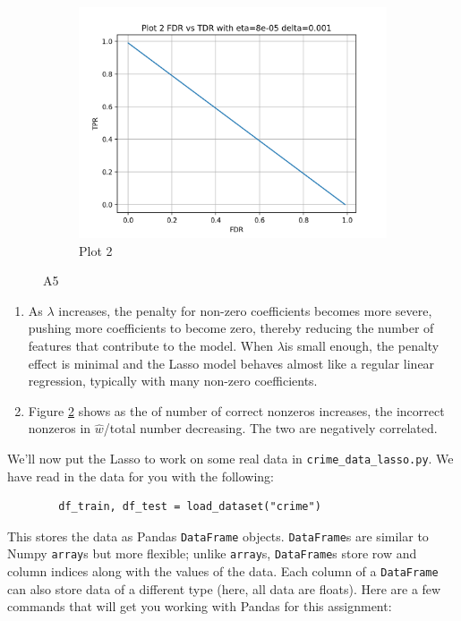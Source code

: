 \documentclass{article}
\begin{document}
\begin{sloppypar}
\begin{aprob}
\begin{figure}[!h]
\begin{subfigure}{.45\textwidth}
            \includegraphics[width=.9\linewidth]{./img/plot2.png}
            \caption{Plot 2}
            \label{fig:plot2}
        \end{subfigure}
        \caption{A5}
    \end{figure}
    \begin{enumerate}
        \item As $\lambda$ increases, the penalty for non-zero coefficients becomes more severe, 
        pushing more coefficients to become zero, thereby reducing the number of features that contribute to the model. 
        When $\lambda$is small enough, the penalty effect is minimal and the Lasso model behaves almost like a regular linear regression, 
        typically with many non-zero coefficients.
        \item Figure \ref{fig:plot2} shows as the of number of correct nonzeros increases, 
        the incorrect nonzeros in $\widehat{w}$/total number decreasing. The two are negatively correlated.
        
    \end{enumerate}
  \end{aprob}
  
\begin{aprob}
    \label{crime} 
    We'll now put the Lasso to work on some real data in \texttt{crime\_data\_lasso.py}. We have read in the data for you with the following:
    
    \begin{verbatim}
        df_train, df_test = load_dataset("crime")
    \end{verbatim}

    This stores the data as Pandas \texttt{DataFrame} objects. \texttt{DataFrame}s are similar to Numpy \texttt{array}s but more flexible; unlike \texttt{array}s, \texttt{DataFrame}s store row and column indices along with the values of the data. Each column of a \texttt{DataFrame} can also store data of a different type (here, all data are floats). 
    Here are a few commands that will get you working with Pandas for this assignment:


\end{aprob}
\end{sloppypar}
\end{document}

